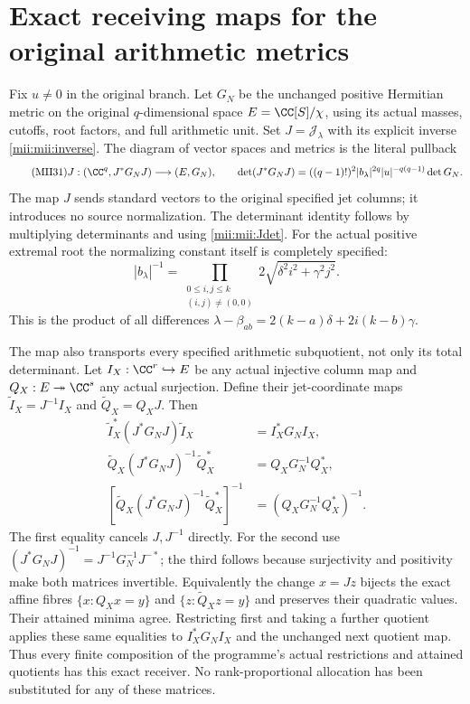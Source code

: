 \section{Exact receiving maps for the original arithmetic metrics}
Fix $u\ne0$ in the original branch. Let $G_N$ be the unchanged
positive Hermitian metric on the original $q$-dimensional space
$E=\CC[S]/\chi$, using its actual masses, cutoffs, root factors,
and full arithmetic unit. Set $J=\mathcal J_\lambda$ with its
explicit inverse \eqref{mii:mii:inverse}. The diagram of vector
spaces and metrics is the literal pullback
\begin{equation}\tag{MII31}\label{mii:mii:gram}
 J:(\CC^q,J^*G_NJ)\longrightarrow(E,G_N),\qquad
 \det(J^*G_NJ)=((q-1)!)^2|b_\lambda|^{2q}
                       |u|^{-q(q-1)}\det G_N.
\end{equation}
The map $J$ sends standard vectors to the original specified
jet columns; it introduces no source normalization. The determinant
identity follows by multiplying determinants and using
\eqref{mii:mii:Jdet}. For the actual positive extremal root the
normalizing constant itself is completely specified:
\begin{equation}\tag{MII32}\label{mii:mii:rootproduct}
 |b_\lambda|^{-1}
  =\prod_{\substack{0\le i,j\le k\\(i,j)\ne(0,0)}}
                   2\sqrt{\delta^2 i^2+\gamma^2j^2}.
\end{equation}
This is the product of all differences
$\lambda-\beta_{ab}=2(k-a)\delta+2i(k-b)\gamma$.

The map also transports every specified arithmetic subquotient,
not only its total determinant. Let $I_X:\CC^r\hookrightarrow E$
be any actual injective column map and $Q_X:E\twoheadrightarrow
\CC^s$ any actual surjection. Define their jet-coordinate maps
$\widetilde I_X=J^{-1}I_X$ and $\widetilde Q_X=Q_XJ$.
Then
\begin{equation}\tag{MII33}\label{mii:mii:restrictions}
 \begin{aligned}
 \widetilde I_X^*(J^*G_NJ)\widetilde I_X&=I_X^*G_NI_X,\\
 \widetilde Q_X(J^*G_NJ)^{-1}\widetilde Q_X^*
                         &=Q_XG_N^{-1}Q_X^*,\\
 \left[\widetilde Q_X(J^*G_NJ)^{-1}\widetilde Q_X^*\right]^{-1}
                         &=(Q_XG_N^{-1}Q_X^*)^{-1}.
 \end{aligned}
\end{equation}
The first equality cancels $J,J^{-1}$ directly. For the second
use $(J^*G_NJ)^{-1}=J^{-1}G_N^{-1}J^{-*}$; the third follows
because surjectivity and positivity make both matrices invertible.
Equivalently the change $x=Jz$ bijects the exact affine fibres
$\{x:Q_Xx=y\}$ and $\{z:\widetilde Q_Xz=y\}$ and preserves their
quadratic values. Their attained minima agree. Restricting first
and taking a further quotient applies these same equalities to
$I_X^*G_NI_X$ and the unchanged next quotient map. Thus every
finite composition of the programme's actual restrictions and
attained quotients has this exact receiver. No rank-proportional
allocation has been substituted for any of these matrices.

